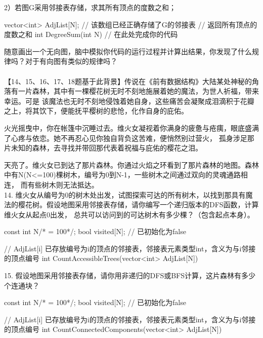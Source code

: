 \begin{exercise}
\begin{cppcode}
\end{cppcode}

2）若图G采用邻接表存储，求其所有顶点的度数之和；
\begin{cppcode}
    vector<int> AdjList[N]; // 该数组已经正确存储了G的邻接表
    // 返回所有顶点的度数之和
    int DegreeSum(int N) {
        // 在此处完成你的代码
    }
\end{cppcode}

随意画出一个无向图，脑中模拟你代码的运行过程并计算出结果，你发现了什么规律吗？对于有向图有类似的规律吗？\\\\



【14、15、16、17、18题基于此背景】传说在《前有数据结构》大陆某处神秘的角落有一片森林，其中有一棵樱花树无时不刻地施展着她的魔法，为世人祈福，带来幸运。可是
该魔法也无时不刻地侵蚀着她自身，这些痛苦会凝聚成泪滴积于花瓣之上，将其饮下，便能抚平樱树的悲怆，化作自身的庇佑。

火光摇曳中，你在帐篷中沉睡过去。维火女凝视着你满身的疲惫与疮痍，眼底盛满了心疼与依恋。她不再忍心见你独自背负这苦难，便悄然别过营火，
孤身涉足那片未知的森林，去寻找并带回那代表着祝福与庇佑的樱花之泪。

天亮了。维火女已到达了那片森林。你通过火焰之环看到了那片森林的地图。森林中有N(N<=100)棵树木，编号为0到N-1，一些树木之间通过双向的灵魂通路相连，
而有些树木则无法抵达。\\


14. 维火女从编号为0的树木处出发，试图探索可达的所有树木，以找到那具有魔法的樱花树。假设地图采用邻接表存储，请你编写一个递归版本的DFS函数，计算维火女从起点0出发，
总共可以访问到的可达树木有多少棵？（包含起点本身）。

\begin{cppcode}
    const int N/* = 100*/;
    bool visited[N];    // 已初始化为false

    // AdjList[i] 已存放编号为i的顶点的邻接表，邻接表元素类型int，含义为与i邻接的顶点编号
    int CountAccessibleTrees(vector<int> AdjList[N]) {
        
    }
\end{cppcode}

\vspace{\baselineskip}

15. 假设地图采用邻接表存储，请你用非递归的DFS或BFS计算，这片森林有多少个连通块？
\begin{cppcode}
    const int N/* = 100*/;
    bool visited[N];    // 已初始化为false

    // AdjList[i] 已存放编号为i的顶点的邻接表，邻接表元素类型int，含义为与i邻接的顶点编号
    int CountConnectedComponents(vector<int> AdjList[N]) {
        
}
\end{cppcode}
\end{exercise}
